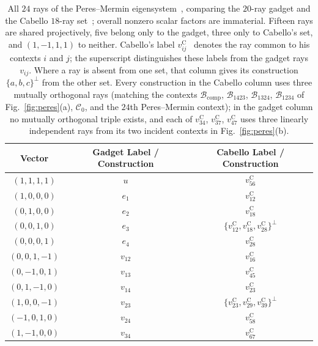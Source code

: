 \documentclass[%
  reprint,
  superscriptaddress,
  showkeys,
  amsmath,amssymb,
  aps,pra,
  longbibliography,
  floatfix,
  x11names
]{revtex4-2}
\begin{document}
\begin{table}[ht]
\caption{All $24$ rays of the Peres--Mermin eigensystem~\cite{peres111,mermin90b,peres-91,pavicic-2004ksafq,svozil-2024-convert-pra-externalfigures,2024-cabello-trandafir0}, comparing the $20$-ray gadget and the Cabello $18$-ray set~\cite{cabello-96,cabello:210401}; overall nonzero scalar factors are immaterial.  Fifteen rays are shared projectively, five belong only to the gadget, three only to Cabello's set, and $(1,-1,1,1)$ to neither.  Cabello's label $v^{\mathrm{C}}_{ij}$~\cite{cabello:210401} denotes the ray common to his contexts $i$ and $j$; the superscript distinguishes these labels from the gadget rays $v_{ij}$.  Where a ray is absent from one set, that column gives its construction $\{a,b,c\}^\perp$ from the other set.  Every construction in the Cabello column uses three mutually orthogonal rays (matching the contexts $\mathcal{B}_{\mathrm{comp}}$, $\mathcal{B}_{1423}$, $\mathcal{B}_{1324}$, $\mathcal{B}_{1234}$ of Fig.~\ref{fig:peres}(a), $\mathcal{C}_0$, and the $24$th Peres--Mermin context); in the gadget column no mutually orthogonal triple exists, and each of $v^{\mathrm{C}}_{34}$, $v^{\mathrm{C}}_{37}$, $v^{\mathrm{C}}_{47}$ uses three linearly independent rays from its two incident contexts in Fig.~\ref{fig:peres}(b).}
\label{tab:vector-equivalence}
\begin{ruledtabular}
\begin{tabular}{ccc}
Vector & Gadget Label / Construction & Cabello Label / Construction \\
\hline
$(1,1,1,1)$ & $u$ & $v^{\mathrm{C}}_{56}$ \\
$(1,0,0,0)$ & $e_1$ & $v^{\mathrm{C}}_{12}$ \\
$(0,1,0,0)$ & $e_2$ & $v^{\mathrm{C}}_{18}$ \\
$(0,0,1,0)$ & $e_3$ & $\{v^{\mathrm{C}}_{12}, v^{\mathrm{C}}_{18}, v^{\mathrm{C}}_{28}\}^\perp$ \\
$(0,0,0,1)$ & $e_4$ & $v^{\mathrm{C}}_{28}$ \\
\hline
$(0,0,1,-1)$ & $v_{12}$ & $v^{\mathrm{C}}_{16}$ \\
$(0,-1,0,1)$ & $v_{13}$ & $v^{\mathrm{C}}_{45}$ \\
$(0,1,-1,0)$ & $v_{14}$ & $v^{\mathrm{C}}_{23}$ \\
$(1,0,0,-1)$ & $v_{23}$ & $\{v^{\mathrm{C}}_{23}, v^{\mathrm{C}}_{29}, v^{\mathrm{C}}_{39}\}^\perp$ \\
$(-1,0,1,0)$ & $v_{24}$ & $v^{\mathrm{C}}_{58}$ \\
$(1,-1,0,0)$ & $v_{34}$ & $v^{\mathrm{C}}_{67}$ \\

\end{tabular}
\end{ruledtabular}
\end{table}
\end{document}
